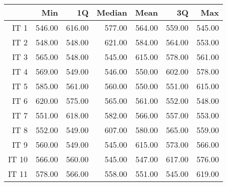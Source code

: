 \begin{table}[ht]
\centering
\begin{tabular}{rrrrrrr}
  \hline
 & Min & 1Q & Median & Mean & 3Q & Max \\ 
  \hline
IT 1 & 546.00 & 616.00 & 577.00 & 564.00 & 559.00 & 545.00 \\ 
  IT 2 & 548.00 & 548.00 & 621.00 & 584.00 & 564.00 & 553.00 \\ 
  IT 3 & 565.00 & 548.00 & 545.00 & 615.00 & 578.00 & 561.00 \\ 
  IT 4 & 569.00 & 549.00 & 546.00 & 550.00 & 602.00 & 578.00 \\ 
  IT 5 & 585.00 & 561.00 & 560.00 & 550.00 & 551.00 & 615.00 \\ 
  IT 6 & 620.00 & 575.00 & 565.00 & 561.00 & 552.00 & 548.00 \\ 
  IT 7 & 551.00 & 618.00 & 582.00 & 566.00 & 557.00 & 553.00 \\ 
  IT 8 & 552.00 & 549.00 & 607.00 & 580.00 & 565.00 & 559.00 \\ 
  IT 9 & 560.00 & 549.00 & 545.00 & 615.00 & 573.00 & 566.00 \\ 
  IT 10 & 566.00 & 560.00 & 545.00 & 547.00 & 617.00 & 576.00 \\ 
  IT 11 & 578.00 & 566.00 & 558.00 & 551.00 & 545.00 & 619.00 \\ 
   \hline
\end{tabular}
\end{table}

